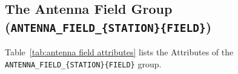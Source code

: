 \documentclass[a4paper,10pt,bibtotoc]{scrartcl}
\begin{document}
\subsection{The Antenna Field Group ({\tt ANTENNA\_FIELD\_\{STATION\}\{FIELD\}})}
\label{sec:antenna field group}

Table~\ref{tab:antenna field attributes} lists the Attributes of the \verb|ANTENNA_FIELD_{STATION}{FIELD}| group.

\vspace{1mm}
\tablefirsthead{%
}
\tablelasttail{\hline}
\end{document}
